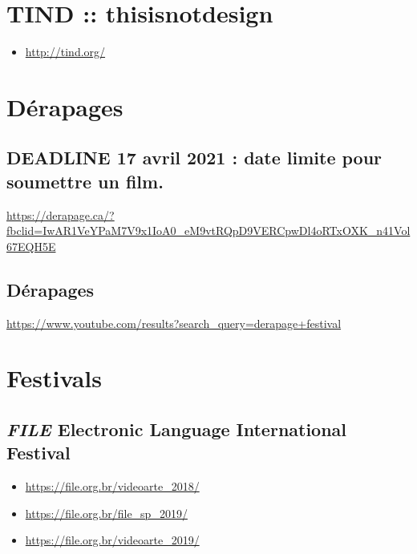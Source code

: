 \documentclass[
  french,
]{book}
\providecommand{\tightlist}{%
  \setlength{\itemsep}{0pt}\setlength{\parskip}{0pt}}
\begin{document}
\hypertarget{tind-thisisnotdesign}{%
\section{TIND :: thisisnotdesign}\label{tind-thisisnotdesign}}

\begin{itemize}
\tightlist
\item
  \url{http://tind.org/}
\end{itemize}

\hypertarget{duxe9rapages}{%
\section{Dérapages}\label{duxe9rapages}}

\hypertarget{deadline-17-avril-2021-date-limite-pour-soumettre-un-film.}{%
\subsection{DEADLINE 17 avril 2021 : date limite pour soumettre un film.}\label{deadline-17-avril-2021-date-limite-pour-soumettre-un-film.}}

\url{https://derapage.ca/?fbclid=IwAR1VeYPaM7V9x1IoA0_eM9vtRQpD9VERCpwDl4oRTxOXK_n41Vol67EQH5E}

\hypertarget{duxe9rapages-1}{%
\subsection{Dérapages}\label{duxe9rapages-1}}

\url{https://www.youtube.com/results?search_query=derapage+festival}

\hypertarget{festivals}{%
\section{Festivals}\label{festivals}}

\hypertarget{file-electronic-language-international-festival}{%
\subsection{\texorpdfstring{\emph{FILE} Electronic Language International Festival}{FILE Electronic Language International Festival}}\label{file-electronic-language-international-festival}}

\begin{itemize}
\tightlist
\item
  \url{https://file.org.br/videoarte_2018/}
\item
  \url{https://file.org.br/file_sp_2019/}
\item
  \url{https://file.org.br/videoarte_2019/}
\end{itemize}
\end{document}
